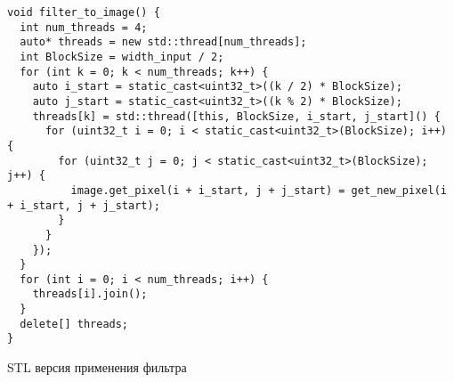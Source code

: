 \documentclass[12pt]{article}
\newenvironment{longlisting}{\captionsetup{type=listing, name=Приложение}}{}
\begin{document}
\begin{longlisting}
\begin{verbatim}
void filter_to_image() {
  int num_threads = 4;
  auto* threads = new std::thread[num_threads];
  int BlockSize = width_input / 2;
  for (int k = 0; k < num_threads; k++) {
    auto i_start = static_cast<uint32_t>((k / 2) * BlockSize);
    auto j_start = static_cast<uint32_t>((k % 2) * BlockSize);
    threads[k] = std::thread([this, BlockSize, i_start, j_start]() {
      for (uint32_t i = 0; i < static_cast<uint32_t>(BlockSize); i++) {
        for (uint32_t j = 0; j < static_cast<uint32_t>(BlockSize); j++) {
          image.get_pixel(i + i_start, j + j_start) = get_new_pixel(i + i_start, j + j_start);
        }
      }
    });
  }
  for (int i = 0; i < num_threads; i++) {
    threads[i].join();
  }
  delete[] threads;
}
\end{verbatim}
\caption{STL версия применения фильтра}
\label{lst:stl}
\end{longlisting}
\end{document}
